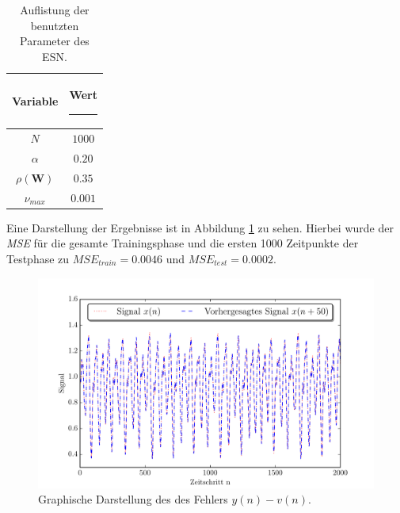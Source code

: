 \begin{table}[H]
	\centering
		\begin{tabular}{|c|c|}
		\rule[-1ex]{0pt}{3.5ex} Variable & \hspace{4ex} Wert \rule[-1ex]{4ex}{0pt}\\ 
		\hline \hline 
		\rule[-1ex]{0pt}{3.5ex} $N$ & $1000$ \\ 
		\hline 
		\rule[-1ex]{0pt}{3.5ex} $\alpha$ & $0.20$ \\ 
		\hline 
		\rule[-1ex]{0pt}{3.5ex} $\rho(\mathbf{W})$ & $0.35$ \\ 
		\hline 
		\rule[-1ex]{0pt}{3.5ex} $\nu_{max}$ & $0.001$ \\ 
		\hline 
	\end{tabular} 
	\caption{Auflistung der benutzten Parameter des \textsc{ESN}.}
\label{tab:application_mackeyglass}
\end{table}

Eine Darstellung der Ergebnisse ist in Abbildung \ref{fig:application_mackeyglass} zu sehen. Hierbei wurde der \textit{MSE} für die gesamte Trainingsphase und die ersten 1000 Zeitpunkte der Testphase zu $MSE_{train} = 0.0046$ und $MSE_{test} = 0.0002$.

\begin{figure}[H]
    \centering
    \includegraphics[width = 0.9 \textwidth]{figures/mackeyglass_pred.pdf}
    \caption{Graphische Darstellung des des Fehlers $y(n)-v(n)$.}
    \label{fig:application_mackeyglass}
\end{figure}